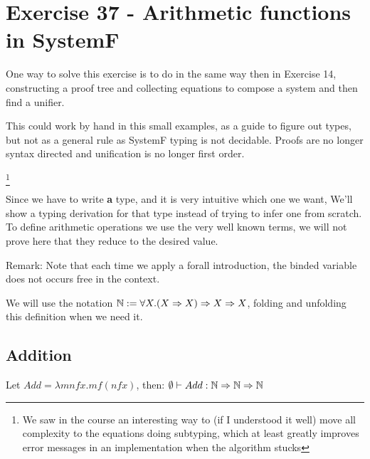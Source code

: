 \newcommand{\NatF}
           {\forall X. (X \Rightarrow X) \Rightarrow X \Rightarrow X}

           
\newcommand{\Arr}
           {\Rightarrow}

           
\section{Exercise 37 - Arithmetic functions in SystemF}

One way to solve this exercise is to do in the same way then in Exercise
14, constructing a proof tree and collecting equations
to compose a system and then find a unifier.

This could work by hand in this small examples, as a guide to figure out
types, but not as a general rule as SystemF typing is not decidable.
Proofs are no longer syntax directed and unification is no longer first
order.

\footnote{We saw in the course an interesting way to
  (if I understood it well) move all complexity to the equations
  doing subtyping, which at least greatly improves error messages in
  an implementation when the algorithm stucks}

Since we have to write {\bf a} type, and it is very intuitive which one
we want, We'll show a typing derivation for that type instead of trying
to infer one from scratch.
To define arithmetic operations we use the very well known terms, we will not
prove here that they reduce to the desired value.

Remark:
Note that each time we apply a forall introduction, the binded variable does
not occurs free in the context.


We will use the notation
$\N := \NatF$, folding and unfolding this definition when we
need it.

\subsection*{Addition}


\begin{theorem}
  Let $Add = \lambda m n f x . m f (n f x)$, then:
  $\emptyset \vdash Add : \N \Arr \N \Arr \N$
\end{theorem}

\newenvironment{scprooftree}[1]%
  {\gdef\scalefactor{#1}\begin{center}\proofSkipAmount \leavevmode}%
  {\scalebox{\scalefactor}{\DisplayProof}\proofSkipAmount \end{center} }



